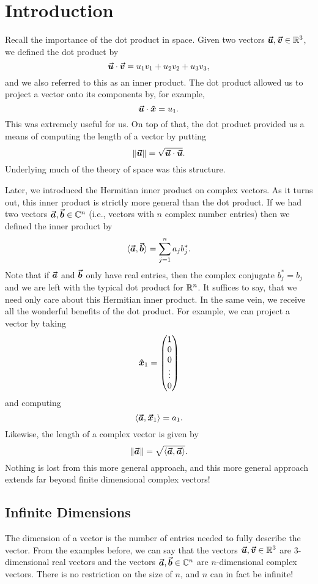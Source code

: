 \section{Introduction}
Recall the importance of the dot product in space.  Given two vectors $\boldsymbol{\boldsymbol{\vec{u}}},\boldsymbol{\boldsymbol{\vec{v}}} \in \mathbb{R}^3$, we defined the dot product by
\[
\boldsymbol{\boldsymbol{\vec{u}}} \cdot \boldsymbol{\boldsymbol{\vec{v}}} = u_1v_1 + u_2v_2 + u_3v_3,
\]
and we also referred to this as an inner product.  The dot product allowed us to project a vector onto its components by, for example,
\[
\boldsymbol{\boldsymbol{\vec{u}}} \cdot \boldsymbol{\hat{x}} = u_1.  
\]
This was extremely useful for us.  On top of that, the dot product provided us a means of computing the length of a vector by putting
\[
\|\boldsymbol{\boldsymbol{\vec{u}}}\|=\sqrt{\boldsymbol{\boldsymbol{\vec{u}}}\cdot\boldsymbol{\boldsymbol{\vec{u}}}}.
\]
Underlying much of the theory of space was this structure. 

Later, we introduced the Hermitian inner product on complex vectors.  As it turns out, this inner product is strictly more general than the dot product.  If we had two vectors $\boldsymbol{\vec{a}},\boldsymbol{\vec{b}}\in \mathbb{C}^n$ (i.e., vectors with $n$ complex number entries) then we defined the inner product by
\[
\langle \boldsymbol{\vec{a}},\boldsymbol{\vec{b}} \rangle = \sum_{j=1}^n a_jb_j^*.
\]
Note that if $\boldsymbol{\vec{a}}$ and $\boldsymbol{\vec{b}}$ only have real entries, then the complex conjugate $b_j^*=b_j$ and we are left with the typical dot product for $\mathbb{R}^n$.  It suffices to say, that we need only care about this Hermitian inner product. In the same vein, we receive all the wonderful benefits of the dot product.  For example, we can project a vector by taking
\[
\boldsymbol{\hat{x}}_1 = \begin{pmatrix} 1 \\ 0 \\ 0 \\\vdots \\ 0 \end{pmatrix}
\]
and computing
\[
\langle \boldsymbol{\vec{a}},\boldsymbol{\boldsymbol{\vec{x}}}_1\rangle = a_1.
\]
Likewise, the length of a complex vector is given by
\[
\|\boldsymbol{\vec{a}}\|=\sqrt{\langle \boldsymbol{\vec{a}},\boldsymbol{\vec{a}}\rangle}.
\]
Nothing is lost from this more general approach, and this more general approach extends far beyond finite dimensional complex vectors!

\subsection{Infinite Dimensions}

The dimension of a vector is the number of entries needed to fully describe the vector.  From the examples before, we can say that the vectors $\boldsymbol{\boldsymbol{\vec{u}}},\boldsymbol{\boldsymbol{\vec{v}}}\in \mathbb{R}^3$ are 3-dimensional real vectors and the vectors $\boldsymbol{\vec{a}},\boldsymbol{\vec{b}} \in \mathbb{C}^n$ are $n$-dimensional complex vectors.  There is no restriction on the size of $n$, and $n$ can in fact be infinite!

